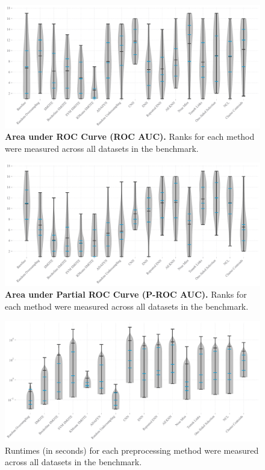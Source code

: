 \documentclass[conference]{IEEEtran}
\begin{document}
\begin{figure}
    \centering
    \includegraphics[width=0.89\linewidth]{plots/roc_auc_ranks_distribution.pdf}
    \caption{
        \textbf{Area under ROC Curve (ROC AUC).} Ranks for each method were measured across all
        datasets in the benchmark.
    }
    \label{figure:roc-auc}
\end{figure}

\begin{figure}
    \centering
    \includegraphics[width=0.89\linewidth]{plots/partial_roc_auc_ranks_distribution.pdf}
    \caption{
        \textbf{Area under Partial ROC Curve (P-ROC AUC).} Ranks for each method were measured
        across all datasets in the benchmark.
    }
    \label{figure:partial-roc-auc}
\end{figure}

\begin{figure}
    \centering
    \includegraphics[width=0.89\linewidth]{plots/preprocessing_times.pdf}
    \caption{
        Runtimes (in seconds) for each preprocessing method were measured across all datasets in
        the benchmark.
    }
    \label{figure:preprocessing-times}
\end{figure}
\end{document}
